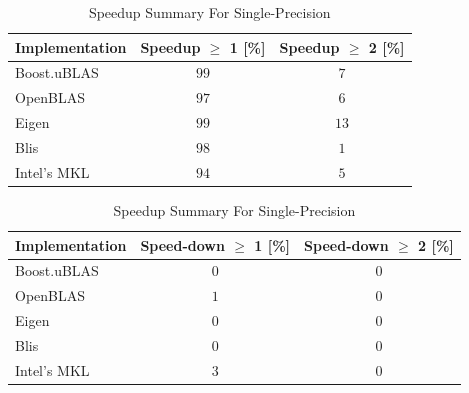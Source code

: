 \begin{table}[ht]
    \centering
    \caption{Speedup Summary For Single-Precision}
    \begin{tabular}{|l|c|c|}
        \hline
        \textbf{Implementation} & \textbf{Speedup $\geq$ 1 [\%]} & \textbf{Speedup $\geq$ 2 [\%]}\\
        \hline
        Boost.uBLAS & $99$ & $7$ \\
        \hline
        OpenBLAS    & $97$ & $6$ \\
        \hline
        Eigen       & $99$ & $13$ \\
        \hline
        Blis        & $98$ & $1$ \\
        \hline
        Intel's MKL & $94$ & $5$ \\
        \hline
    \end{tabular}
    \newline
    \vspace*{1 cm}
    \newline
    \begin{tabular}{|l|c|c|}
        \hline
        \textbf{Implementation} & \textbf{Speed-down $\geq$ 1 [\%]} & \textbf{Speed-down $\geq$ 2 [\%]}\\
        \hline
        Boost.uBLAS & $0$ & $0$ \\
        \hline
        OpenBLAS    & $1$ & $0$ \\
        \hline
        Eigen       & $0$ & $0$ \\
        \hline
        Blis        & $0$ & $0$ \\
        \hline
        Intel's MKL & $3$ & $0$ \\
        \hline
    \end{tabular}
\end{table}

